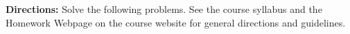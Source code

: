 \documentclass[11pt]{article}
\begin{document}


%

\newcommand{\compicon}%
{%
	\begin{tikzpicture}[scale=0.15]%
		\draw[double] (0,0) rectangle (1,1) ;
		\begin{scope}[yshift=-5pt]
			\draw (-0.5, -0.5) rectangle (1.5, 0) ;
		\end{scope}
	\end{tikzpicture}
}

\makeatletter
\def\@oddfoot{}
\makeatother

\newcommand{\Leg}[2]%
{%
	\left(\frac{#1}{#2}\right)%
}

\noindent
\textbf{Directions:} Solve the following problems.  See the course syllabus and the Homework Webpage on the course website for general directions and guidelines.
\end{document}
